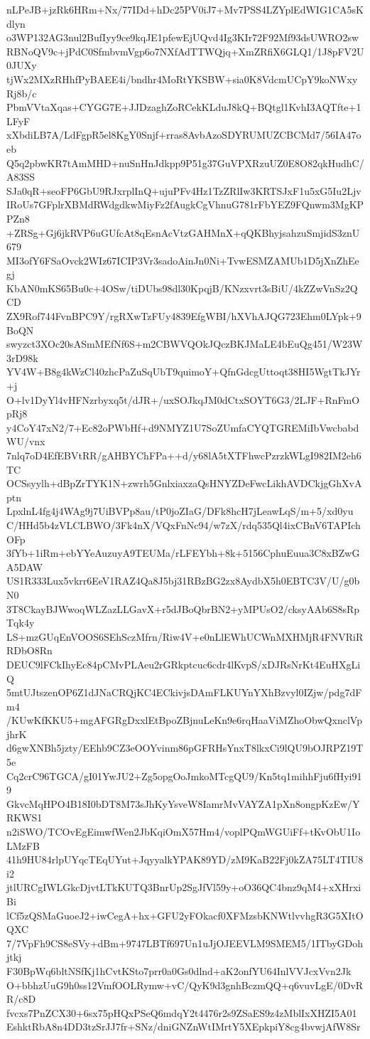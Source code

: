 nLPeJB+jzRk6HRm+Nx/77IDd+hDc25PV0iJ7+Mv7PSS4LZYplEdWIG1CA5sKdlyn
o3WP132AG3nul2BufIyy9ce9kqJE1pfewEjUQvd4Ig3KIr72F92Mf93dsUWRO2sw
RBNoQV9c+jPdC0SfmbvmVgp6o7NXfAdTTWQjq+XmZRfiX6GLQ1/1J8pFV2U0JUXy
tjWx2MXzRHhfPyBAEE4i/bndhr4MoRtYKSBW+sia0K8VdcmUCpY9koNWxyRj8b/c
PbmVVtaXqas+CYGG7E+JJDzaghZoRCekKLduJ8kQ+BQtgl1KvhI3AQTfte+1LFyF
xXbdiLB7A/LdFgpR5el8KgY0Snjf+rras8AvbAzoSDYRUMUZCBCMd7/56IA47oeb
Q5q2pbwKR7tAmMHD+nuSnHnJdkpp9P51g37GuVPXRzuUZ0E8O82qkHudhC/A83SS
SJa0qR+seoFP6GbU9RJxrplInQ+ujuPFv4Hz1TzZRlIw3KRTSJxF1u5xG5Iu2Ljv
IRoUs7GFplrXBMdRWdgdkwMiyFz2fAugkCgVhnuG781rFbYEZ9FQnwm3MgKPPZn8
+ZRSg+Gj6jkRVP6uGUfcAt8qEsnAcVtzGAHMnX+qQKBhyjsahzuSmjidS3znU679
MI3ofY6FSaOvck2WIz67ICIP3Vr3sadoAinJn0Ni+TvwESMZAMUb1D5jXnZhEegj
KbAN0mKS65Bu0c+4OSw/tiDUbs98dl30KpqjB/KNzxvrt3sBiU/4kZZwVnSz2QCD
ZX9Rof744FvnBPC9Y/rgRXwTzFUy4839EfgWBI/hXVhAJQG723Ehm0LYpk+9BoQN
swyzct3XOc20sASmMEfNf6S+m2CBWVQOkJQczBKJMaLE4bEuQg451/W23W3rD98k
YV4W+B8g4kWzCl40zhcPaZuSqUbT9quimoY+QfnGdcgUttoqt38HI5WgtTkJYr+j
O+lv1DyYl4vHFNzrbyxq5t/dJR+/uxSOJkqJM0dCtxSOYT6G3/2LJF+RnFmOpRj8
y4CoY47xN2/7+Ec82oPWbHf+d9NMYZ1U7SoZUmfaCYQTGREMiIbVwcbabdWU/vnx
7nlq7oD4EfEBVtRR/gAHBYChFPa++d/y68lA5tXTFhwcPzrzkWLgI982IM2eh6TC
OCSsyylh+dBpZrTYK1N+zwrh5GnlxiaxzaQsHNYZDeFwcLikhAVDCkjgGhXvAptn
LpxlnL4fg4j4WAg9j7UiBVPp8au/tP0joZIaG/DFk8hcH7jLeawLqS/m+5/xd0yu
C/HHd5b4zVLCLBWO/3Fk4nX/VQxFnNc94/w7zX/rdq535Ql4ixCBnV6TAPIchOFp
3fYb+1iRm+ebYYeAuzuyA9TEUMa/rLFEYbh+8k+5156CphuEuua3C8xBZwGA5DAW
US1R333Lux5vkrr6EeV1RAZ4Qa8J5bj31RBzBG2zx8AydbX5h0EBTC3V/U/g0bN0
3T8CkayBJWwoqWLZazLLGavX+r5dJBoQbrBN2+yMPUsO2/cksyAAb6S8sRpTqk4y
LS+mzGUqEnVOOS6SEhSczMfrn/Riw4V+e0nLlEWhUCWnMXHMjR4FNVRiRRDbO8Rn
DEUC9lFCkIhyEc84pCMvPLAeu2rGRkptcuc6cdr4lKvpS/xDJRsNrKt4EuHXgLiQ
5mtUJtszenOP6Z1dJNaCRQjKC4ECkivjsDAmFLKUYnYXhBzvyl0IZjw/pdg7dFm4
/KUwKfKKU5+mgAFGRgDxxlEtBpoZBjnuLeKn9e6rqHaaViMZhoObwQxnclVpjhrK
d6gwXNBh5jzty/EEhb9CZ3eOOYvinm86pGFRHsYnxT8lkxCi9lQU9bOJRPZ19T5e
Cq2crC96TGCA/gI01YwJU2+Zg5opgOoJmkoMTcgQU9/Kn5tq1mihhFju6fHyi919
GkvcMqHPO4B18I0bDT8M73sJhKyYsveW8IamrMvVAYZA1pXn8ongpKzEw/YRKWS1
n2iSWO/TCOvEgEimwfWen2JbKqiOmX57Hm4/voplPQmWGUiFf+tKvObU1IoLMzFB
41h9HU84rlpUYqcTEqUYut+JqyyalkYPAK89YD/zM9KaB22Fj0kZA75LT4TIU8i2
jtlURCgIWLGkcDjvtLTkKUTQ3BnrUp2SgJfVl59y+oO36QC4bnz9qM4+xXHrxiBi
lCf5zQSMaGuoeJ2+iwCegA+hx+GFU2yFOkacf0XFMzsbKNWtlvvhgR3G5XItOQXC
7/7VpFh9CS8eSVy+dBm+9747LBTf697Un1uJjOJEEVLM9SMEM5/1ITbyGDohjtkj
F30BpWq6bltNSfKj1hCvtKSto7prr0a0Gs0dlnd+aK2onfYU64InlVVJcxVvn2Jk
O+bbhzUuG9h0ss12VmfOOLRymw+vC/QyK9d3gnhBczmQQ+q6vuvLgE/0DvRR/c8D
fvcxs7PnZCX30+6sx75pHQxPSeQ6mdqY2t4476r2s9ZSaES9z4zMblIxXHZI5A01
EshktRbA8n4DD3tzSrJJ7fr+SNz/dniGNZnWtIMrtY5XEpkpiY8cg4bvwjAfW8Sr
